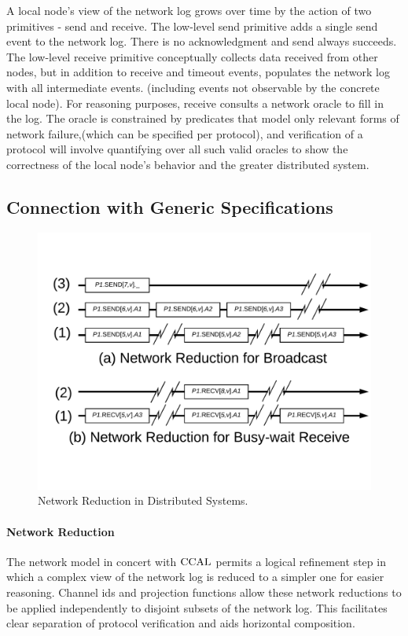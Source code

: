 A local node's view of the network log grows over time by the action of two
primitives - send and receive. The low-level send primitive adds a single send
event to the network log. There is no acknowledgment and send always succeeds.
The low-level receive primitive conceptually collects data received from other
nodes, but in addition to receive and timeout events, populates the network log
with all intermediate events. (including events not observable by the
concrete local node). For reasoning purposes, receive consults a network oracle
to fill in the log. The oracle is constrained by predicates that model only
relevant forms of network failure,(which can be specified per protocol), and
verification of a protocol will involve quantifying over all such valid oracles
to show the correctness of the local node's behavior and the greater distributed
system.


\subsection{Connection with Generic Specifications}
\label{chapter:witnesspassing:subsec:connection}

\begin{figure}
\begin{center}
\includegraphics[scale=0.35]{figs/witnesspassing/network_reduction.pdf}
\end{center}
\caption{Network Reduction in Distributed Systems.}
\label{fig:chapter:witnesspassing:network-reduction}
\end{figure}

\paragraph{Network Reduction}
The network model in concert with $\mathrm{CCAL}$ permits a logical refinement step in
which a complex view of the network log is reduced to a simpler one for easier
reasoning. Channel ids and projection functions allow these network
reductions to be applied independently to disjoint subsets of the network log.
This facilitates clear separation of protocol verification and aids
horizontal composition.

